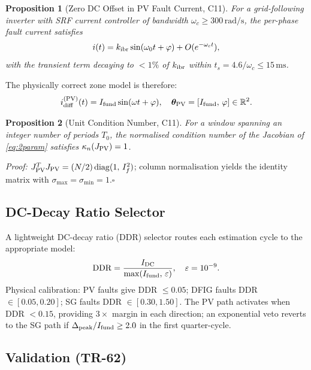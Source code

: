 \documentclass[journal,twoside]{IEEEtran}
\newtheorem{proposition}{Proposition}
\begin{document}
\begin{proposition}[Zero DC Offset in PV Fault Current, C11]
\label{prop:pv_dc}
For a grid-following inverter with SRF current controller of bandwidth
$\omega_c \geq 300\,\text{rad/s}$, the per-phase fault current satisfies
\begin{equation}
  i(t) = k_{\rm ibr}\sin(\omega_0 t + \varphi) + O(e^{-\omega_c t}),
\end{equation}
with the transient term decaying to $< 1\%$ of $k_{\rm ibr}$ within
$t_s = 4.6/\omega_c \leq 15\,\text{ms}$.
\end{proposition}

The physically correct zone model is therefore:
\begin{equation}
  i_{\rm diff}^{(\rm PV)}(t) = I_{\rm fund}\sin(\omega t + \varphi),
  \quad \bm{\theta}_{\rm PV} = [I_{\rm fund},\,\varphi] \in \mathbb{R}^2.
  \label{eq:2param}
\end{equation}

\begin{proposition}[Unit Condition Number, C11]
\label{prop:kappa1}
For a window spanning an integer number of periods $T_0$, the normalised
condition number of the Jacobian of \eqref{eq:2param} satisfies
$\kappa_n(J_{\rm PV}) = 1$.
\end{proposition}

\noindent\textit{Proof:} $J_{\rm PV}^T J_{\rm PV} = (N/2)\,\mathrm{diag}
(1,\,I_f^2)$; column normalisation yields the identity matrix with
$\sigma_{\max} = \sigma_{\min} = 1$.\hfill$\square$

\subsection{DC-Decay Ratio Selector}

A lightweight DC-decay ratio (DDR) selector routes each estimation cycle to the
appropriate model:
\begin{equation}
  \mathrm{DDR} = \frac{I_{\rm DC}}{\max(I_{\rm fund},\,\varepsilon)},
  \quad \varepsilon = 10^{-9}.
  \label{eq:ddr}
\end{equation}
Physical calibration: PV faults give DDR $\leq 0.05$; DFIG faults
DDR $\in [0.05, 0.20]$; SG faults DDR $\in [0.30, 1.50]$.
The PV path activates when DDR $< 0.15$, providing $3\times$ margin in each
direction; an exponential veto reverts to the SG path if
$\Delta_{\rm peak}/I_{\rm fund} \geq 2.0$ in the first quarter-cycle.

\subsection{Validation (TR-62)}
\end{document}
